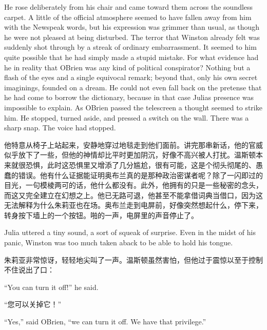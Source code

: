 \begin{paracol}{2}
He rose deliberately from his chair and came toward them across the
soundless carpet. A little of the official atmosphere seemed to have
fallen away from him with the Newspeak words, but his expression was
grimmer than usual, as though he were not pleased at being disturbed.
The terror that Winston already felt was suddenly shot through by a
streak of ordinary embarrassment. It seemed to him quite possible that
he had simply made a stupid mistake. For what evidence had he in reality
that O\textquotesingle Brien was any kind of political conspirator?
Nothing but a flash of the eyes and a single equivocal remark; beyond
that, only his own secret imaginings, founded on a dream. He could not
even fall back on the pretense that he had come to borrow the
dictionary, because in that case Julia\textquotesingle s presence was
impossible to explain. As O\textquotesingle Brien passed the telescreen
a thought seemed to strike him. He stopped, turned aside, and pressed a
switch on the wall. There was a sharp snap. The voice had stopped.

\switchcolumn

他特意从椅子上站起来，安静地穿过地毯走到他们面前。讲完那串新话，他的官威似乎放下了一些，但他的神情却比平时更加阴沉，好像不高兴被人打扰。温斯顿本来就很恐惧，此时这恐惧里又增添了几分尴尬，很有可能，这是个彻头彻尾的、愚蠢的错误。他有什么证据能证明奥布兰真的是那种政治密谋者呢？除了一闪即过的目光，一句模棱两可的话，他什么都没有。此外，他拥有的只是一些秘密的念头，而这又完全建立在幻想之上。他已无路可退，他甚至不能拿借词典当借口，因为这无法解释为什么朱莉亚也在场。奥布兰走到电屏前，好像突然想起什么，停下来，转身按下墙上的一个按钮。啪的一声，电屏里的声音停止了。

\switchcolumn*

Julia uttered a tiny sound, a sort of squeak of surprise. Even in the
midst of his panic, Winston was too much taken aback to be able to hold
his tongue.

\switchcolumn

朱莉亚非常惊讶，轻轻地尖叫了一声。温斯顿虽然害怕，但他过于震惊以至于控制不住说出了口：

\switchcolumn*

``You can turn it off!'' he said.

\switchcolumn

``您可以关掉它！''

\switchcolumn*

``Yes,'' said O\textquotesingle Brien, ``we can turn it off. We have that
privilege.''


\end{paracol}
